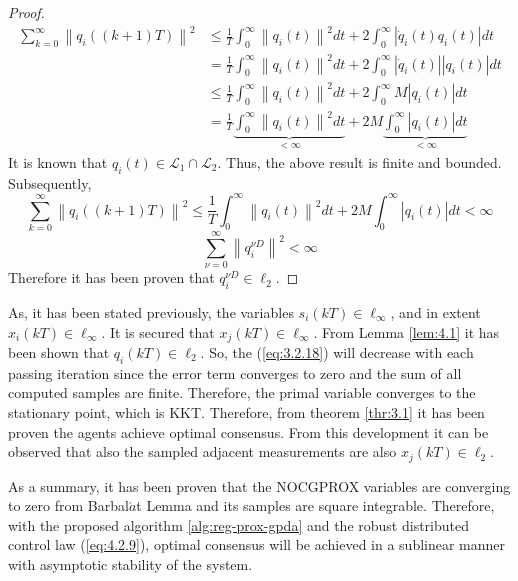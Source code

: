 \begin{proof}
        \begin{equation*}
            \begin{align*}
                \sum_{k = 0}^{\infty} \left\lVert q_i((k+1)T)\right\rVert^2 &\leq  \frac{1}{T}\int_{0}^{\infty} \left\lVert q_i(t)\right\rVert^2dt + 2 \int_{0}^{\infty}\left\lvert\dot{q}_i(t)q_i(t) \right\rvert dt\\
                &=  \frac{1}{T}\int_{0}^{\infty} \left\lVert q_i(t)\right\rVert^2dt + 2 \int_{0}^{\infty}\left\lvert\dot{q}_i(t) \right\rvert \left\lvert q_i(t) \right\rvert dt\\
                &\leq \frac{1}{T}\int_{0}^{\infty} \left\lVert q_i(t)\right\rVert^2dt + 2 \int_{0}^{\infty} M\left\lvert q_i(t) \right\rvert dt\\
                &= \frac{1}{T}\underbrace{\int_{0}^{\infty} \left\lVert q_i(t)\right\rVert^2dt}_{< \infty} + 2M \underbrace{\int_{0}^{\infty} \left\lvert q_i(t) \right\rvert dt}_{<\infty}
            \end{align*}
        \end{equation*}
        It is known that $q_i(t) \in \mathcal{L}_{1}\cap\mathcal{L}_{2}$. Thus, the above result is finite and bounded. Subsequently,
        \begin{equation*}
            \sum_{k = 0}^{\infty} \left\lVert q_i((k+1)T)\right\rVert^2 \leq \frac{1}{T}\int_{0}^{\infty} \left\lVert q_i(t)\right\rVert^2dt + 2M \int_{0}^{\infty} \left\lvert q_i(t) \right\rvert dt < \infty
        \end{equation*}
        \begin{equation*}
            \sum_{\nu = 0}^{\infty} \left\lVert q_i^{\nu D}\right\rVert^2 < \infty
        \end{equation*}
        Therefore it has been proven that $q_i^{\nu D} \in \mathcal{\ell}_2$.
    \end{proof}
    \newpage
    As, it has been stated previously, the variables $s_i(kT) \in \mathcal{\ell}_{\infty}$, and in extent $x_i(kT) \in \mathcal{\ell}_{\infty}$. It is secured that $x_j(kT) \in \mathcal{\ell}_{\infty}$. From Lemma \ref{lem:4.1} it has been shown that $q_i(kT) \in \mathcal{\ell}_2$. So, the (\ref{eq:3.2.18}) will decrease with each passing iteration since the error term converges to zero and the sum of all computed samples are finite. Therefore, the primal variable converges to the stationary point, which is KKT. Therefore, from theorem \ref{thr:3.1} it has been proven the agents achieve optimal consensus. From this development it can be observed that also the sampled adjacent measurements are also $x_j(kT) \in \mathcal{\ell}_2$.
    
    As a summary, it has been proven that the NOCGPROX variables are converging to zero from Barbal$\acute{a}$t Lemma and its samples are square integrable.  Therefore, with the proposed algorithm \ref{alg:reg-prox-gpda} and the robust distributed control law (\ref{eq:4.2.9}), optimal consensus will be achieved in a sublinear manner with asymptotic stability of the system. 




    